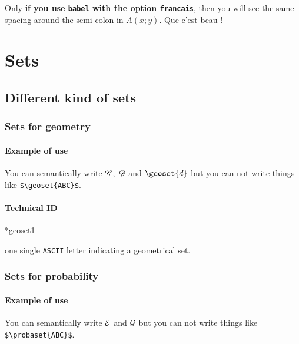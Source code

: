 \documentclass[12pt,a4paper]{article}
\makeatletter
\newcommand\ascii{\texttt{ASCII}}
\theoremstyle{definition}
\newcommand\IDmacro{\@ifstar{\@IDmacroStar}{\@IDmacroNoStar}}
\newcommand\@IDmacroNoStar[3]{%
        \texttt{%
        	\textbackslash#1%
        	\IfStrEq{#2}{0}{}{%
        		\,\,[#2 Option%
				\IfStrEq{#2}{1}{}{s}]%
			}%
    	    \IfStrEq{#3}{}{}{%
	    		\,\,(#3 Argument%
				\IfStrEq{#3}{1}{}{s})%
			}
	   	}
        \immediate\write\tempfile{macro@#1@#2@#3}%
    }
\newcommand\@IDmacroStar[2]{%
        \@IDmacroNoStar{#1}{0}{#2}%
    }
\newcommand\@IDoptarg{\@ifstar{\@IDoptargStar}{\@IDoptargNoStar}}
\newcommand\@IDoptargStar[2]{%
    	\vspace{0.5em}
		--- \texttt{#1%
			\IfStrEq{#2}{}{:}{\,#2:}%
		}%
	}
\newcommand\@IDoptargNoStar[2]{%
    	\IfStrEq{#2}{}{%
			\@IDoptargStar{#1}{}%
		}{%
			\@IDoptargStar{#1}{\##2}%
		}%
	}
\newcommand\IDarg[1]{%
    	\@IDoptarg{Argument}{#1}%
	}
\makeatother
\begin{document}
\begin{tcblisting}{}
Only \textbf{if you use \texttt{babel} with the option \texttt{francais}}, then
you will see the same spacing around the semi-colon in $A(x;y)$. Que c'est beau !
\end{tcblisting}


\section{Sets}



\subsection{Different kind of sets}

    \subsubsection{Sets for geometry}

        \paragraph{Example of use}

\begin{tcblisting}{}
You can semantically write $\geoset{C}$, $\geoset{D}$ and $\geoset{d}$ but you can
not write things like \verb+$\geoset{ABC}$+.
\end{tcblisting}


        \paragraph{Technical ID}

\IDmacro*{geoset}{1}

\IDarg{} one single \ascii{} letter indicating a geometrical set.



    \subsubsection{Sets for probability}

        \paragraph{Example of use}

\begin{tcblisting}{}
You can semantically write $\probaset{E}$ and $\probaset{G}$ but you can not write
things like \verb+$\probaset{ABC}$+.
\end{tcblisting}
\end{document}
